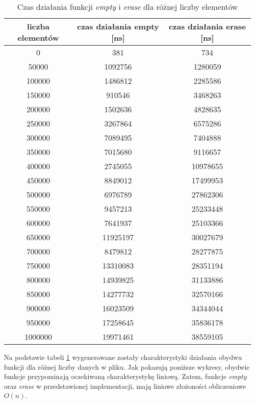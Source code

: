 \begin{table}[H]
    \centering
    \caption{Czas działania funkcji \textit{empty} i \textit{erase} dla różnej liczby elementów}
    \label{tab: przeszukiwanie_empty_erase}
    \begin{tabular}{|c|c|c|}
    \hline
    liczba elementów & czas działania empty  [ns]  & czas działania erase [ns]   \\ \hline
    0                & 381      & 734      \\ \hline
    50000            & 1092756  & 1280059  \\ \hline
    100000           & 1486812  & 2285586  \\ \hline
    150000           & 910546   & 3468263  \\ \hline
    200000           & 1502636  & 4828635  \\ \hline
    250000           & 3267864  & 6575286  \\ \hline
    300000           & 7089495  & 7404888  \\ \hline
    350000           & 7015680  & 9116657  \\ \hline
    400000           & 2745055  & 10978655 \\ \hline
    450000           & 8849012  & 17499953 \\ \hline
    500000           & 6976789  & 27862306 \\ \hline
    550000           & 9457213  & 25233448 \\ \hline
    600000           & 7641937  & 25103366 \\ \hline
    650000           & 11925197 & 30027679 \\ \hline
    700000           & 8479812  & 28277875 \\ \hline
    750000           & 13310083 & 28351194 \\ \hline
    800000           & 14939825 & 31133886 \\ \hline
    850000           & 14277732 & 32570166 \\ \hline
    900000           & 16023509 & 34344044 \\ \hline
    950000           & 17258645 & 35836178 \\ \hline
    1000000          & 19971461 & 38559105 \\ \hline
    \end{tabular}
\end{table}



Na podstawie tabeli \ref{tab: przeszukiwanie_empty_erase} wygenerowane zostały charakterystyki działania obydwu funkcji dla różnej liczby danych w pliku. Jak pokazują poniższe wykresy, obydwie funkcje przypominają oczekiwaną charakterystykę liniową. Zatem, funkcje \textit{empty} oraz \textit{erase} w przedstawionej implementacji, mają liniowe złożoności obliczeniowe $O(n)$. 

